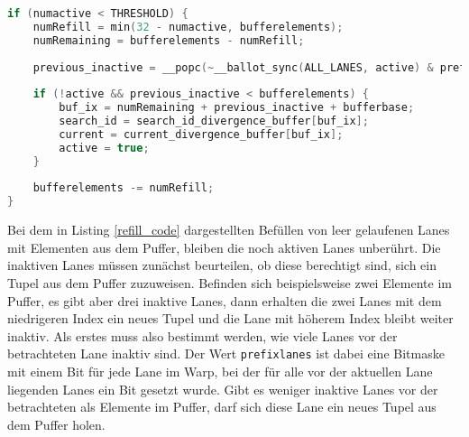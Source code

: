 \begin{lstlisting}[language=C++,
caption=Befüllen inaktiver Lanes mit Elementen aus dem Puffer,
label=refill_code]
if (numactive < THRESHOLD) {
	numRefill = min(32 - numactive, bufferelements);
	numRemaining = bufferelements - numRefill;
	
	previous_inactive = __popc(~__ballot_sync(ALL_LANES, active) & prefixlanes);
	
	if (!active && previous_inactive < bufferelements) {
		buf_ix = numRemaining + previous_inactive + bufferbase;
		search_id = search_id_divergence_buffer[buf_ix];
		current = current_divergence_buffer[buf_ix];
		active = true;
	}
	
	bufferelements -= numRefill;
}
\end{lstlisting}

Bei dem in Listing \ref{refill_code} dargestellten Befüllen von leer gelaufenen Lanes mit Elementen aus dem Puffer, bleiben die noch aktiven Lanes unberührt.
Die inaktiven Lanes müssen zunächst beurteilen, ob diese berechtigt sind, sich ein Tupel aus dem Puffer zuzuweisen.
Befinden sich beispielsweise zwei Elemente im Puffer, es gibt aber drei inaktive Lanes, dann erhalten die zwei Lanes mit dem niedrigeren Index ein neues Tupel und die Lane mit höherem Index bleibt weiter inaktiv.
Als erstes muss also bestimmt werden, wie viele Lanes vor der betrachteten Lane inaktiv sind.
Der Wert \texttt{prefixlanes} ist dabei eine Bitmaske mit einem Bit für jede Lane im Warp, bei der für alle vor der aktuellen Lane liegenden Lanes ein Bit gesetzt wurde.
Gibt es weniger inaktive Lanes vor der betrachteten als Elemente im Puffer, darf sich diese Lane ein neues Tupel aus dem Puffer holen.

